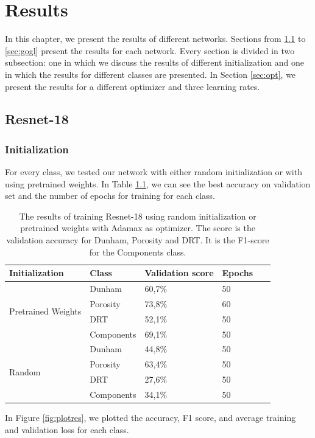 \chapter{Results}\label{chp:results}

In this chapter, we present the results of different networks. Sections from \ref{sec:res} to \ref{sec:gogl} present the results for each network. Every section is divided in two subsection: one in which we discuss the results of different initialization and one in which the results for different classes are presented. In Section \ref{sec:opt}, we present the results for a different optimizer and three learning rates. 
\section{Resnet-18}\label{sec:res}
\subsection{Initialization}
For every class, we tested our network with either random initialization or with using pretrained weights. In Table \ref{tab:resinit}, we can see the best accuracy on validation set and the number of epochs for training for each class.  

\begin{table}
\caption[Results according to initialization of Resnet-18]{\label{tab:resinit} The results of training Resnet-18 using random initialization or pretrained weights with Adamax as optimizer. The score is the validation accuracy for Dunham, Porosity and DRT. It is the F1-score for the Components class.}
\centering
\begin{tabular}[b]{| l | l | l | l | l |}
\hline
    Initialization & Class & Validation score & Epochs\ \\ \hline
    \multirow{4}{*}{Pretrained Weights} & Dunham &  60,7\%  & 50 \\ 
    & Porosity & 73,8\%  &  60 \\
    &DRT & 52,1\% &  50 \\
    &Components & 69,1\% &  50 \\ \hline
     \multirow{4}{*}{Random} & Dunham &  44,8\%  & 50 \\
    & Porosity & 63,4\% &  50 \\
    &DRT & 27,6\% & 50 \\
    &Components & 34,1\% &  50 \\ \hline
    
\end{tabular} 
\end{table}
In Figure \ref{fig:plotres}, we plotted the accuracy, F1 score, and average training and validation loss for each class. 


